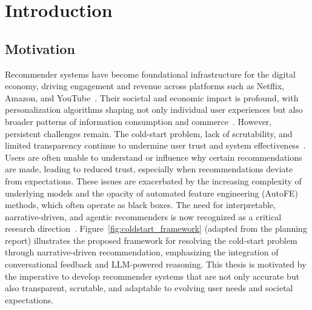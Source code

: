 \doublespacing %

\chapter{Introduction}
\label{ch1}

\begin{spacing}{1} %
\minitoc %
\end{spacing} %
\thesisspacing %


\section{Motivation}
Recommender systems have become foundational infrastructure for the digital economy, driving engagement and revenue across platforms such as Netflix, Amazon, and YouTube~\cite{Resnick1994GroupLens,Koren2009MatrixFactorization,Linden2003Amazon}. Their societal and economic impact is profound, with personalization algorithms shaping not only individual user experiences but also broader patterns of information consumption and commerce~\cite{Planning_Report}. However, persistent challenges remain. The cold-start problem, lack of scrutability, and limited transparency continue to undermine user trust and system effectiveness~\cite{Planning_Report}. Users are often unable to understand or influence why certain recommendations are made, leading to reduced trust, especially when recommendations deviate from expectations. These issues are exacerbated by the increasing complexity of underlying models and the opacity of automated feature engineering (AutoFE) methods, which often operate as black boxes. The need for interpretable, narrative-driven, and agentic recommenders is now recognized as a critical research direction~\cite{litterature_review,Planning_Report}. Figure~\ref{fig:coldstart_framework} (adapted from the planning report) illustrates the proposed framework for resolving the cold-start problem through narrative-driven recommendation, emphasizing the integration of conversational feedback and LLM-powered reasoning. This thesis is motivated by the imperative to develop recommender systems that are not only accurate but also transparent, scrutable, and adaptable to evolving user needs and societal expectations.


